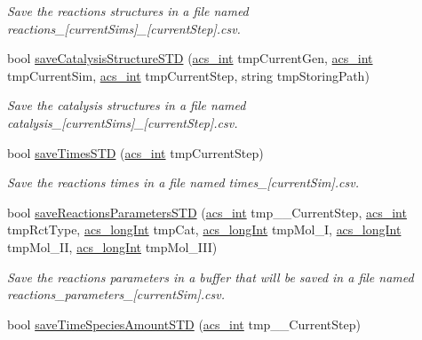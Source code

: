 \begin{DoxyCompactItemize}
\begin{DoxyCompactList}\small\item\em Save the reactions structures in a file named reactions\-\_\-\mbox{[}current\-Sims\mbox{]}\-\_\-\mbox{[}current\-Step\mbox{]}.csv. \end{DoxyCompactList}\item 
bool \hyperlink{a00011_a0a799b3a42bd90845a915298e184708c}{save\-Catalysis\-Structure\-S\-T\-D} (\hyperlink{a00024_a8d277355641a098190360234e2ebde35}{acs\-\_\-int} tmp\-Current\-Gen, \hyperlink{a00024_a8d277355641a098190360234e2ebde35}{acs\-\_\-int} tmp\-Current\-Sim, \hyperlink{a00024_a8d277355641a098190360234e2ebde35}{acs\-\_\-int} tmp\-Current\-Step, string tmp\-Storing\-Path)
\begin{DoxyCompactList}\small\item\em Save the catalysis structures in a file named catalysis\-\_\-\mbox{[}current\-Sims\mbox{]}\-\_\-\mbox{[}current\-Step\mbox{]}.csv. \end{DoxyCompactList}\item 
bool \hyperlink{a00011_af8083321a2bc93f4f613b05d74d37833}{save\-Times\-S\-T\-D} (\hyperlink{a00024_a8d277355641a098190360234e2ebde35}{acs\-\_\-int} tmp\-Current\-Step)
\begin{DoxyCompactList}\small\item\em Save the reactions times in a file named times\-\_\-\mbox{[}current\-Sim\mbox{]}.csv. \end{DoxyCompactList}\item 
bool \hyperlink{a00011_ae342684050eb7b52144015d258133098}{save\-Reactions\-Parameters\-S\-T\-D} (\hyperlink{a00024_a8d277355641a098190360234e2ebde35}{acs\-\_\-int} tmp\-\_\-\-\_\-\-Current\-Step, \hyperlink{a00024_a8d277355641a098190360234e2ebde35}{acs\-\_\-int} tmp\-Rct\-Type, \hyperlink{a00024_a19319d75f02db4308bc5c0026d98cd85}{acs\-\_\-long\-Int} tmp\-Cat, \hyperlink{a00024_a19319d75f02db4308bc5c0026d98cd85}{acs\-\_\-long\-Int} tmp\-Mol\-\_\-\-I, \hyperlink{a00024_a19319d75f02db4308bc5c0026d98cd85}{acs\-\_\-long\-Int} tmp\-Mol\-\_\-\-I\-I, \hyperlink{a00024_a19319d75f02db4308bc5c0026d98cd85}{acs\-\_\-long\-Int} tmp\-Mol\-\_\-\-I\-I\-I)
\begin{DoxyCompactList}\small\item\em Save the reactions parameters in a buffer that will be saved in a file named reactions\-\_\-parameters\-\_\-\mbox{[}current\-Sim\mbox{]}.csv. \end{DoxyCompactList}\item 
bool \hyperlink{a00011_a65c52d6a1b463c1123bdb62cba9fd088}{save\-Time\-Species\-Amount\-S\-T\-D} (\hyperlink{a00024_a8d277355641a098190360234e2ebde35}{acs\-\_\-int} tmp\-\_\-\-\_\-\-Current\-Step)

\end{DoxyCompactItemize}
